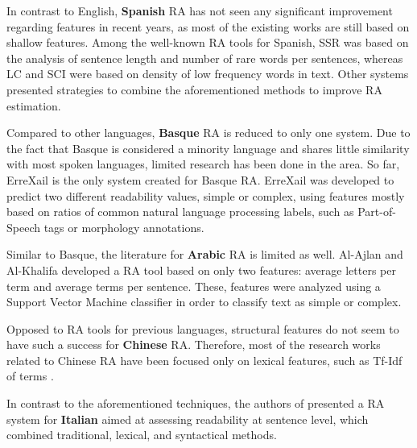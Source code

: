 \documentclass{bsu-ms}
\begin{document}
In contrast to English, \textbf{Spanish} RA has not seen any significant improvement regarding features in recent years, as most of the existing works are still based on shallow features. Among the well-known RA tools for Spanish,  SSR \cite{spaulding1956spanish} was based on the analysis of sentence length and number of rare words per sentences, whereas LC and SCI \cite{anula2007tipos} were based on density of low frequency words in text. Other systems \cite{vstajner2013readability,drndarevic2013automatic} presented strategies to combine the aforementioned methods to improve RA estimation.





Compared to other languages, \textbf{Basque} RA is reduced to only one system. Due to the fact that Basque is considered a minority language and shares little similarity with most spoken languages, limited research has been done in the area. So far,  ErreXail \cite{gonzalez2014simple} is the only system created for Basque RA. ErreXail was developed to predict two different readability values, simple or complex, using features mostly based on ratios of common natural language processing labels, such as Part-of-Speech tags or morphology annotations.

Similar to Basque, the literature for \textbf{Arabic} RA is limited as well. Al-Ajlan and Al-Khalifa \cite{al2008towards} developed a RA tool based on only two features: average letters per term and average terms per sentence. These, features were analyzed using a Support Vector Machine classifier in order to classify text as simple or complex.

Opposed to RA tools for previous languages, structural features do not seem to have such a success for \textbf{Chinese} RA. Therefore, most of the research works  related to Chinese RA have been focused only on lexical features, such as Tf-Idf of terms \cite{chen2011chinese,collins2004language}.



In contrast to the aforementioned techniques, the authors of \cite{dell2011read}   presented a RA system for \textbf{Italian} aimed at assessing readability at sentence level, which combined traditional, lexical, and syntactical methods.%
\end{document}
